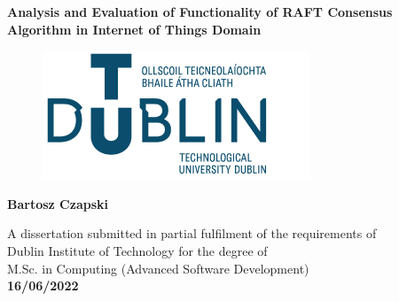 \documentclass[oneside,12pt]{book}
\begin{document}
\begin{titlepage}
    \begin{center}
        \vspace*{1.5cm}
        
        \Huge
        \textbf{Analysis and Evaluation of Functionality of RAFT Consensus Algorithm in Internet of Things Domain}
        
        \vspace{0.5cm}
        \begin{figure}[H]
    	\centering
    	\hspace{7mm} \includegraphics[scale=0.5]{TU_logo}
        \end{figure}
        
        \vspace{1.5cm}
        
        \textbf{Bartosz Czapski}
        
        \vfill
       \large
        A dissertation submitted in partial fulfilment of the requirements of\\
	Dublin Institute of Technology for the degree of\\
	M.Sc. in Computing (Advanced Software Development)\\
       \vspace{0.5cm}
        \textbf{16/06/2022}
        \vspace{0.8cm}
 
    \end{center}
\end{titlepage}

\pagestyle{fancy}
\fancyhf{}
\fancyfoot[CE,CO]{\thepage}
\renewcommand{\headrulewidth}{0pt}




\setlength{\bibleftmargin}{1cm}


\end{document}
